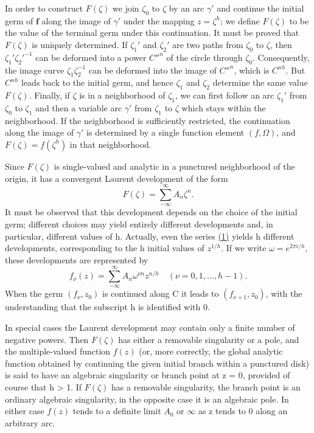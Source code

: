 In order to construct $F(\zeta)$ we join $\zeta_0$ to $\zeta$ by an arc $\gamma'$ and continue the initial germ of $\mathbf{f}$ along the image of $\gamma'$ under the mapping $z = \zeta^h$; we define $F(\zeta)$ to be the value of the terminal germ under this continuation. It must be proved that $F(\zeta)$ is uniquely determined. If $\zeta_1'$ and $\zeta_2'$ are two paths
from $\zeta_0$ to $\zeta$, then $\zeta_1'\zeta_2'^{-1}$ can be deformed into a power $C''^n$ of the circle through $\zeta_0$. Consequently, the image curve $\zeta_1\zeta_2^{-1}$ can be deformed into the image of $C''^n$, which is $C^{nh}$. But $C^{nh}$ leads back to the initial germ, and hence $\zeta_1$ and $\zeta_2$ determine the same value $F(\zeta)$. Finally, if $\zeta$ is in a neighborhood of $\zeta_1$, we can first follow an arc $\zeta_1'$ from $\zeta_0$ to $\zeta_1$ and then a variable arc $\gamma'$ from $\zeta_1$ to $\zeta$ which stays within the neighborhood. If the neighborhood is sufficiently restricted, the continuation along the image of $\gamma'$ is determined by a single function element $(f,\Omega)$, and $F(\zeta) = f(\zeta^h)$ in that neighborhood.

Since $F(\zeta)$ is single-valued and analytic in a punctured neighborhood of the origin, it has a convergent Laurent development of the form
\begin{equation*}
F (\zeta) = \sum_ {- \infty} ^ {\infty} A _ {n} \zeta^ {n}.\tag{1}\label{eq:8.1}
\end{equation*}
It must be observed that this development depends on the choice of the initial germ; different choices may yield entirely different developments and, in particular, different values of h. Actually, even the series \hyperref[eq:8.1]{(1)} yields h different developments, corresponding to the h initial values of $z^{1/h}$. If we write $\omega = e^{2\pi i/h}$, these developments are represented by
\begin{equation*}
f _ {\nu} (z) = \sum_ {- \infty} ^ {\infty} A _ {n} \omega^ {\nu n} z ^ {n / h} \quad (\nu = 0, 1, \dots , h - 1).\tag{2}\label{eq:8.2}
\end{equation*}
When the germ $(f_{\nu},z_{0})$ is continued along C it leads to $(f_{\nu+1},z_{0})$, with the understanding that the subscript h is identified with 0.

In special cases the Laurent development may contain only a finite number of negative powers. Then $F(\zeta)$ has either a removable singularity or a pole, and the multiple-valued function $f(z)$ (or, more correctly, the global analytic function obtained by continuing the given initial branch within a punctured disk) is said to have an algebraic singularity or branch point at z = 0, provided of course that h > 1. If $F(\zeta)$ has a removable singularity, the branch point is an ordinary algebraic singularity, in the opposite case it is an algebraic pole. In either case $f(z)$ tends to a definite limit $A_{0}$ or $\infty$ as z tends to 0 along an arbitrary arc.

